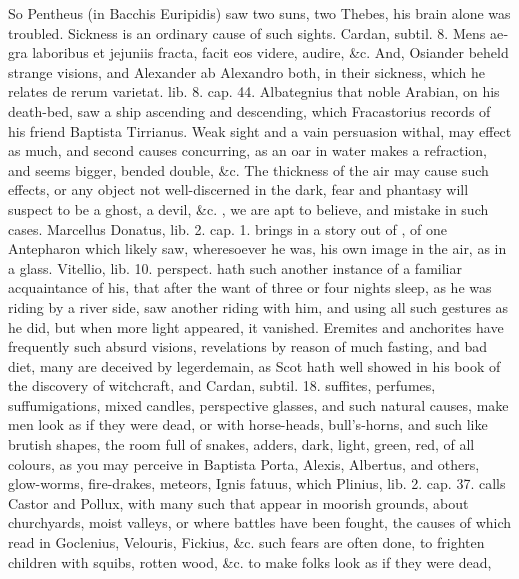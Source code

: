 {So Pentheus (in Bacchis Euripidis) saw two suns, two Thebes, his brain
alone was troubled. Sickness is an ordinary cause of such sights.
\textlatin{Cardan, subtil. 8. Mens aegra laboribus et jejuniis fracta, facit eos
videre, audire}, \&c. And, Osiander beheld strange visions, and Alexander
ab Alexandro both, in their sickness, which he relates \textlatin{de rerum
varietat. lib. 8. cap. 44.} Albategnius that noble Arabian, on his
death-bed, saw a ship ascending and descending, which Fracastorius
records of his friend Baptista Tirrianus. Weak sight and a vain
persuasion withal, may effect as much, and second causes concurring, as
an oar in water makes a refraction, and seems bigger, bended double,
\&c. The thickness of the air may cause such effects, or any object not
well-discerned in the dark, fear and phantasy will suspect to be a
ghost, a devil, \&c. ,
we are apt to believe, and mistake in such cases. Marcellus Donatus,
lib. 2. cap. 1. brings in a story out of \Aristotle{}, of one Antepharon
which likely saw, wheresoever he was, his own image in the air, as in a
glass. Vitellio, lib. 10. perspect. hath such another instance of a
familiar acquaintance of his, that after the want of three or four
nights sleep, as he was riding by a river side, saw another riding with
him, and using all such gestures as he did, but when more light
appeared, it vanished. Eremites and anchorites have frequently such
absurd visions, revelations by reason of much fasting, and bad diet,
many are deceived by legerdemain, as Scot hath well showed in his book
of the discovery of witchcraft, and Cardan, subtil. 18. suffites,
perfumes, suffumigations, mixed candles, perspective glasses, and such
natural causes, make men look as if they were dead, or with
horse-heads, bull's-horns, and such like brutish shapes, the room full
of snakes, adders, dark, light, green, red, of all colours, as you may
perceive in Baptista Porta, Alexis, Albertus, and others, glow-worms,
fire-drakes, meteors, Ignis fatuus, which Plinius, lib. 2. cap. 37.
calls Castor and Pollux, with many such that appear in moorish grounds,
about churchyards, moist valleys, or where battles have been fought,
the causes of which read in Goclenius, Velouris, Fickius, \&c. such
fears are often done, to frighten children with squibs, rotten wood,
\&c. to make folks look as if they were dead, 
}
